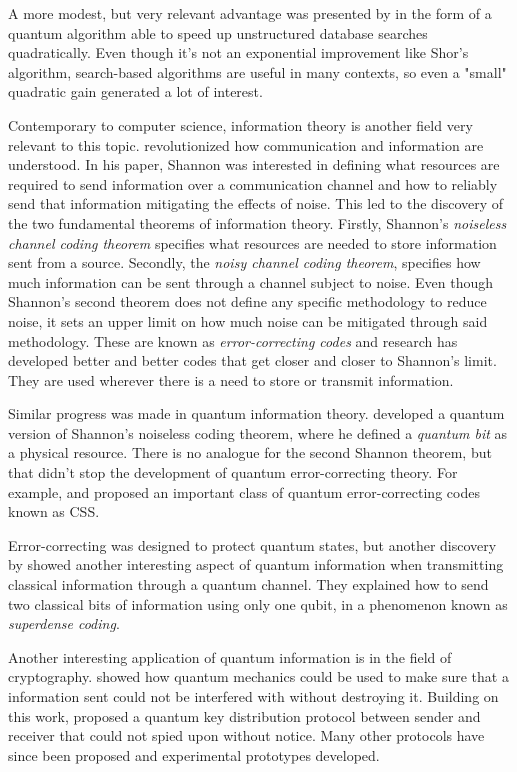 \documentclass[../../dissertation.tex]{subfiles}
\begin{document}
A more modest, but very relevant advantage was presented by \cite{grover1996} in the form of a quantum algorithm able to speed up unstructured
database searches quadratically. Even though it's not an exponential
improvement like Shor's algorithm, search-based algorithms are useful in many
contexts, so even a "small" quadratic gain generated a lot of interest.\par

Contemporary to computer science, information theory is another field very
relevant to this topic. \cite{shannon48} revolutionized how communication and
information are understood. In his paper, Shannon was interested in defining
what resources are required to send information over a communication channel
and how to reliably send that information mitigating the effects of noise. This
led to the discovery of the two fundamental theorems of information theory.
Firstly, Shannon's \textit{noiseless channel coding theorem} specifies what
resources are needed to store information sent from a source. Secondly, the
\textit{noisy channel coding theorem}, specifies how much information can be
sent through a channel subject to noise. Even though Shannon's second theorem
does not define any specific methodology to reduce noise, it sets an upper
limit on how much noise can be mitigated through said methodology. These are
known as \textit{error-correcting codes} and research has developed better and
better codes that get closer and closer to Shannon's limit. They are used
wherever there is a need to store or transmit information.\par 

Similar progress was made in quantum information theory. \cite{schumacher95}
developed a quantum version of Shannon's noiseless coding theorem, where he
defined a \textit{quantum bit} as a physical resource. There is no analogue for
the second Shannon theorem, but that didn't stop the development of quantum
error-correcting theory. For example, \cite{shorcalder96} and \cite{steane96}
proposed an important class of quantum error-correcting codes known as CSS.\par

Error-correcting was designed to protect quantum states, but another discovery
by \cite{wisnerbennet92} showed another interesting aspect of quantum
information when transmitting classical information through a quantum channel.
They explained how to send two classical bits of information using only one
qubit, in a phenomenon known as \textit{superdense coding}.\par Another
interesting application of quantum information is in the field of cryptography.
\cite{wisner60} showed how quantum mechanics could be used to make sure that a
information sent could not be interfered with without destroying it. Building
on this work, \cite{bennetbassard84} proposed a quantum key distribution
protocol between sender and receiver that could not spied upon without notice.
Many other protocols have since been proposed and experimental prototypes
developed.\par
\end{document}
